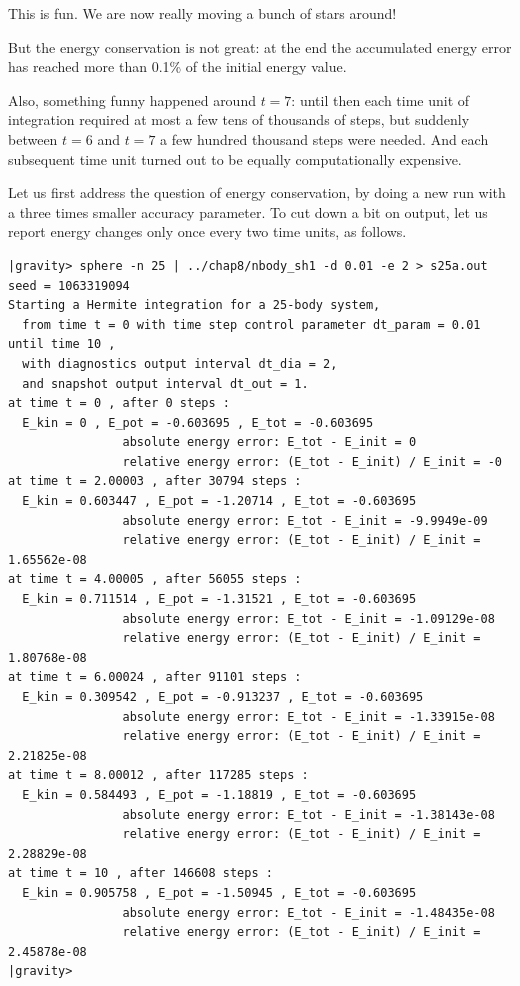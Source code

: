 \abc

\alice
This is fun.  We are now really moving a bunch of stars around!

\carol
But the energy conservation is not great: at the end the accumulated
energy error has reached more than 0.1\% of the initial energy value.

\bob
Also, something funny happened around $t=7$: until then each time unit
of integration required at most a few tens of thousands of steps, but
suddenly between $t=6$ and $t=7$ a few hundred thousand steps were needed.
And each subsequent time unit turned out to be equally computationally
expensive.

\carol
Let us first address the question of energy conservation, by doing a
new run with a three times smaller accuracy parameter.  To cut down a
bit on output, let us report energy changes only once every two time units,
as follows.

\cba

\begin{small}
\begin{verbatim}
|gravity> sphere -n 25 | ../chap8/nbody_sh1 -d 0.01 -e 2 > s25a.out
seed = 1063319094
Starting a Hermite integration for a 25-body system,
  from time t = 0 with time step control parameter dt_param = 0.01  until time 10 ,
  with diagnostics output interval dt_dia = 2,
  and snapshot output interval dt_out = 1.
at time t = 0 , after 0 steps :
  E_kin = 0 , E_pot = -0.603695 , E_tot = -0.603695
                absolute energy error: E_tot - E_init = 0
                relative energy error: (E_tot - E_init) / E_init = -0
at time t = 2.00003 , after 30794 steps :
  E_kin = 0.603447 , E_pot = -1.20714 , E_tot = -0.603695
                absolute energy error: E_tot - E_init = -9.9949e-09
                relative energy error: (E_tot - E_init) / E_init = 1.65562e-08
at time t = 4.00005 , after 56055 steps :
  E_kin = 0.711514 , E_pot = -1.31521 , E_tot = -0.603695
                absolute energy error: E_tot - E_init = -1.09129e-08
                relative energy error: (E_tot - E_init) / E_init = 1.80768e-08
at time t = 6.00024 , after 91101 steps :
  E_kin = 0.309542 , E_pot = -0.913237 , E_tot = -0.603695
                absolute energy error: E_tot - E_init = -1.33915e-08
                relative energy error: (E_tot - E_init) / E_init = 2.21825e-08
at time t = 8.00012 , after 117285 steps :
  E_kin = 0.584493 , E_pot = -1.18819 , E_tot = -0.603695
                absolute energy error: E_tot - E_init = -1.38143e-08
                relative energy error: (E_tot - E_init) / E_init = 2.28829e-08
at time t = 10 , after 146608 steps :
  E_kin = 0.905758 , E_pot = -1.50945 , E_tot = -0.603695
                absolute energy error: E_tot - E_init = -1.48435e-08
                relative energy error: (E_tot - E_init) / E_init = 2.45878e-08
|gravity> 
\end{verbatim}
\end{small}

